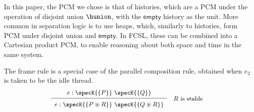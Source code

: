 In this paper, the PCM we chose is that of histories, which are a PCM
under the operation of disjoint union $\hunion$, with the
$\mathsf{empty}$ history as the unit. More common in separation logic
is to use heaps, which, similarly to histories, form PCM under
disjoint union and $\mathsf{empty}$. In FCSL, these can be combined
into a Cartesian product PCM, to enable reasoning about both space and
time in the same system.


The frame rule is a special case of the parallel composition rule,
obtained when $e_2$ is taken to be the idle thread.
\[
{\small{
\begin{array}{c}
e : \specK{\{P\}}\ \specK{\{Q\}}\\[2pt]
\hline\\[-7pt]
e : \specK{\{P \circledast R\}}\ \specK{\{Q \circledast R\}} 
\end{array}  \quad \mbox{$R$ is stable} 
}}
\]

